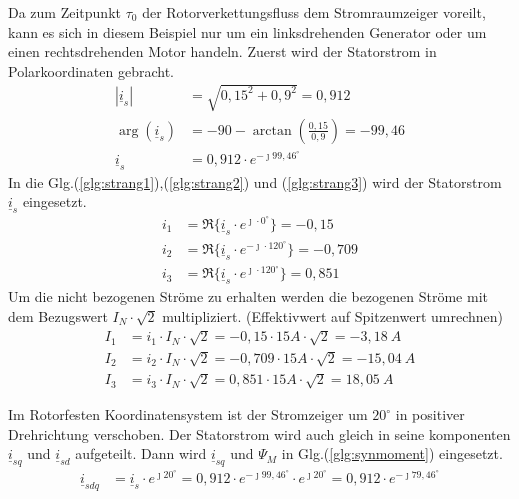 \begin{solution}
	\begin{compactenum}
		\item Da zum Zeitpunkt $\tau_0$ der Rotorverkettungsfluss dem Stromraumzeiger voreilt, kann es sich in diesem Beispiel nur um ein linksdrehenden Generator oder um einen rechtsdrehenden Motor handeln. Zuerst wird der Statorstrom in Polarkoordinaten gebracht.
		\begin{align}
			|\underline{i}_s|  &= \sqrt{0,15^2 + 0,9^2}= 0,912 \\
			\arg(\underline{i}_s) & =-90 - \arctan\left (\frac{0,15}{0,9} \right ) =-99,46 \\
			\underline{i}_s  &= 0,912 \cdot e^{-\jmath 99,46 ^\circ}
		\end{align}
		In die Glg.(\ref{glg:strang1}),(\ref{glg:strang2}) und (\ref{glg:strang3}) wird der Statorstrom $\underline{i}_s$ eingesetzt.
		\begin{align}
			i_1 & = \Re \{ \underline{i}_s \cdot e^{\jmath \cdot 0 ^\circ} \} = -0,15\\
			i_2 & = \Re \{ \underline{i}_s \cdot e^{-\jmath \cdot 120 ^\circ} \} = -0,709 \\
			i_3 & = \Re \{ \underline{i}_s \cdot e^{\jmath \cdot 120 ^\circ} \}=  0,851
		\end{align}
		Um die nicht bezogenen Ströme zu erhalten werden die bezogenen Ströme mit dem Bezugswert $I_N \cdot \sqrt{2}$ multipliziert. (Effektivwert auf Spitzenwert umrechnen)
		\begin{align}
			I_1 & = i_1 \cdot I_N \cdot \sqrt{2} = -0,15 \cdot 15 A \cdot \sqrt{2} =-3,18~A \\
			I_2 & = i_2 \cdot I_N \cdot \sqrt{2} = -0,709 \cdot 15 A \cdot \sqrt{2} = -15,04~A\\
			I_3 & = i_3 \cdot I_N \cdot \sqrt{2} = 0,851\cdot 15 A \cdot \sqrt{2} =18,05~A
		\end{align}
		\item Im Rotorfesten Koordinatensystem ist der Stromzeiger um $20^\circ$ in positiver Drehrichtung verschoben. Der Statorstrom wird auch gleich in seine komponenten $\underline{i}_{sq}$ und $\underline{i}_{sd}$ aufgeteilt. Dann wird $\underline{i}_{sq}$ und $\Psi_M$ in Glg.(\ref{glg:synmoment}) eingesetzt.
		\begin{align}
			\underline{i}_{sdq} & = \underline{i}_s \cdot e^{\jmath 20 ^\circ} = 0,912 \cdot e^{-\jmath 99,46 ^\circ} \cdot e^{\jmath 20 ^\circ} = 0,912 \cdot e^{-\jmath 79,46 ^\circ} \\

\end{align}
\end{compactenum}
\end{solution}
